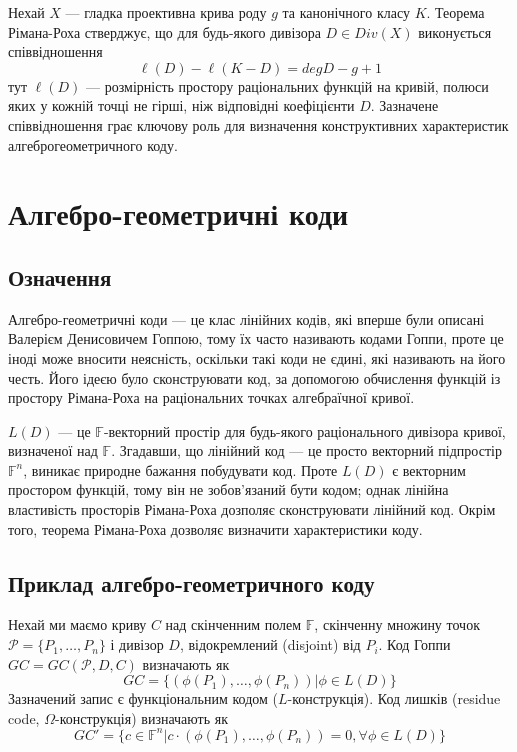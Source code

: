 \documentclass[a4paper,14pt,oneside]{extarticle}
\begin{document}
Нехай $X$ --- гладка проективна крива роду $g$ та канонічного класу $K$. Теорема Рімана-Роха стверджує, 
що для будь-якого дивізора $D \in Div(X)$ виконується співвідношення
$$\ell(D) - \ell(K-D) = deg D - g +1$$
тут $\ell(D)$ --- розмірність простору раціональних функцій на кривій, полюси яких у кожній точці не гірші, 
ніж відповідні коефіцієнти $D$. Зазначене співвідношення грає ключову роль для визначення конструктивних 
характеристик алгеброгеометричного коду.

\pagebreak
\section{Алгебро-геометричні коди}
\subsection{Означення}
Алгебро-геометричні коди --- це клас лінійних кодів, які вперше були описані Валерієм Денисовичем Гоппою, 
тому їх часто називають кодами Гоппи, проте це іноді може вносити неясність, оскільки такі коди не єдині, які називають на його честь. 
Його ідеєю було сконструювати код, за допомогою обчислення функцій із простору Рімана-Роха на раціональних точках алгебраїчної кривої. 

$L(D)$ --- це $\mathbb{F}$-векторний простір для будь-якого раціонального дивізора кривої, визначеної над $\mathbb{F}$. 
Згадавши, що лінійний код --- це просто векторний підпростір $\mathbb{F}^n$, виникає природне бажання побудувати код. 
Проте $L(D)$ є векторним простором функцій, тому він не зобов'язаний бути кодом; однак лінійна властивість просторів Рімана-Роха дозполяє сконструювати лінійний код. 
Окрім того, теорема Рімана-Роха дозволяє визначити характеристики коду.

\subsection{Приклад алгебро-геометричного коду}
Нехай ми маємо криву $C$ над скінченним полем $\mathbb{F}$, скінченну множину точок $\mathcal{P} = \{P_1, \dots , P_n \}$ і дивізор $D$, відокремлений (disjoint) від $P_i$. 
Код Гоппи $GC = GC(\mathcal{P}, D, C)$ визначають як
$$GC = \{ (\phi(P_1), \dots , \phi(P_n)) | \phi \in L(D) \}$$
Зазначений запис є функціональним кодом ($L$-конструкція). Код лишків (residue code, $\Omega$-конструкція) визначають як
$$GC' = \{ c \in \mathbb{F}^n | c \cdot (\phi(P_1), \dots , \phi(P_n)) = 0, \forall \phi \in L(D) \}$$
\end{document}
